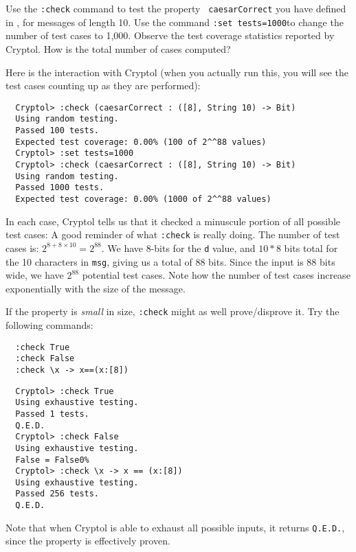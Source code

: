 \begin{Exercise}\label{ex:quick:0}
  Use the {\tt :check} command to test the property {\tt
    caesarCorrect} you have defined in
  , for messages of length
  10.  Use the command {\tt :set tests=1000}\indQCCount to change the
  number of test cases to 1,000.  Observe the test coverage statistics
  reported by Cryptol. How is the total number of cases computed?
\end{Exercise}
\begin{Answer}
  Here is the interaction with Cryptol (when you actually run this,
  you will see the test cases counting up as they are
  performed):\indQCCount
\begin{Verbatim}
  Cryptol> :check (caesarCorrect : ([8], String 10) -> Bit)
  Using random testing.
  Passed 100 tests.
  Expected test coverage: 0.00% (100 of 2^^88 values)
  Cryptol> :set tests=1000
  Cryptol> :check (caesarCorrect : ([8], String 10) -> Bit)
  Using random testing.
  Passed 1000 tests.
  Expected test coverage: 0.00% (1000 of 2^^88 values)
\end{Verbatim}
In each case, Cryptol tells us that it checked a minuscule portion of
all possible test cases: A good reminder of what {\tt :check} is
really doing.  The number of test cases is: $2^{8+8\times10} =
2^{88}$. We have 8-bits for the {\tt d} value, and $10*8$ bits total
for the 10 characters in {\tt msg}, giving us a total of 88
bits. Since the input is 88 bits wide, we have $2^{88}$ potential test
cases. Note how the number of test cases increase exponentially with
the size of the message.
\end{Answer}

\begin{Exercise}\label{ex:quick:1}
  If the property is \emph{small} in size, {\tt :check} might as well
  prove/disprove it. Try the following commands:
\begin{Verbatim}
  :check True
  :check False
  :check \x -> x==(x:[8])
\end{Verbatim}
\end{Exercise}
\begin{Answer}
\begin{Verbatim}
  Cryptol> :check True
  Using exhaustive testing.
  Passed 1 tests.
  Q.E.D.
  Cryptol> :check False
  Using exhaustive testing.
  False = False0%
  Cryptol> :check \x -> x == (x:[8])
  Using exhaustive testing.
  Passed 256 tests.
  Q.E.D.
\end{Verbatim}
Note that when Cryptol is able to exhaust all possible inputs, it returns \texttt{Q.E.D.}, since the property is effectively proven.
\end{Answer}

